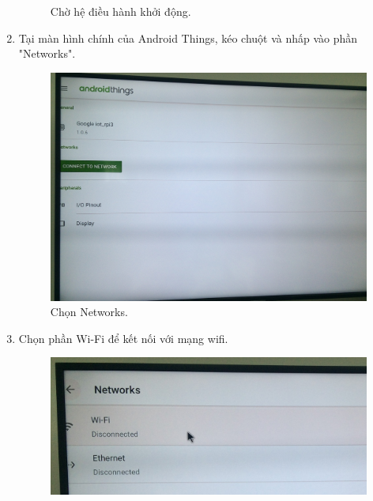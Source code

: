 \begin{enumerate}
\begin{center}
\begin{figure}[htp]
\begin{center}
\end{center}
\caption{Chờ hệ điều hành khởi động.}
\label{refhinh1}
\end{figure}
\end{center}
\newpage
\item Tại màn hình chính của Android Things, kéo chuột và nhấp vào phần "Networks".
\begin{center}
\begin{figure}[htp]
\begin{center}
\includegraphics[scale=0.1]{image3/buoc3s3.JPG}
\end{center}
\caption{Chọn Networks.}
\label{refhinh1}
\end{figure}
\end{center}
\item Chọn phần Wi-Fi để kết nối với mạng wifi.
\begin{center}
\begin{figure}[htp]
\begin{center}
\includegraphics[scale=0.15]{image3/buoc3s4.JPG}
\end{center}

\end{figure}
\end{center}
\end{enumerate}
